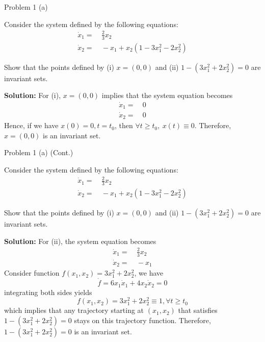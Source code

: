 \documentclass[8pt]{beamer}
\let\tempone\itemize
\let\temptwo\enditemize
\newenvironment{proitemize}{\vspace{-1em}\tempone}{\temptwo}%
\begin{document}
\begin{frame}[t]{Problem 1 (a)}%
  \begin{block}{}
  Consider the system defined by the following equations:
  \begin{align*}
    \dot x_1=&~\frac{2}{3}x_2\\
    \dot x_2=&~-x_1+x_2(1-3x_1^2-2x_2^2)
\end{align*}
  \begin{proitemize}
    \item[(a)] Show that the points defined by (i) $x=(0,0)$ and (ii) $1-(3x_1^2+2x_2^2)=0$ are invariant sets.
  \end{proitemize}
\end{block}
  {\bf Solution:}
  For (i), $x=(0,0)$ implies that the system equation becomes
  \begin{align*}
    \dot x_1=&~0\\
    \dot x_2=&~0
\end{align*}
  Hence, if we have $x(0)=0,t=t_0$, then $\forall t \ge t_0, \ x(t)\equiv 0$. Therefore, $x=(0,0)$ is an invariant set.
\end{frame}

\begin{frame}[t]{Problem 1 (a) (Cont.)}%
  \begin{block}{}
  Consider the system defined by the following equations:
  \begin{align*}
    \dot x_1=&~\frac{2}{3}x_2\\
    \dot x_2=&~-x_1+x_2(1-3x_1^2-2x_2^2)
\end{align*}
  \begin{proitemize}
    \item[(a)] Show that the points defined by (i) $x=(0,0)$ and (ii) $1-(3x_1^2+2x_2^2)=0$ are invariant sets.
  \end{proitemize}
\end{block}
  {\bf Solution:}
        For (ii), the system equation becomes
        \begin{align*}
          \dot x_1=&~\frac{2}{3}x_2\\
          \dot x_2=&~-x_1
      \end{align*}
        Consider function $f(x_1,x_2)=3x_{1}^{2}+2x_{2}^{2}$, we have 
        $$\dot{f}=6x_1\dot{x}_1+4x_2\dot{x}_2=0$$
        integrating both sides yields $$f(x_1,x_2)=3x_{1}^{2}+2x_{2}^{2}\equiv 1, \forall t\geq t_0$$
        which implies that any trajectory starting at $(x_1,x_2)$ that satisfies $1-(3x_{1}^{2}+2x_{2}^{2}) = 0$ stays on this trajectory function. Therefore,  $1-(3x_{1}^{2}+2x_{2}^{2}) = 0$ is an invariant set.
\end{frame}
\end{document}
